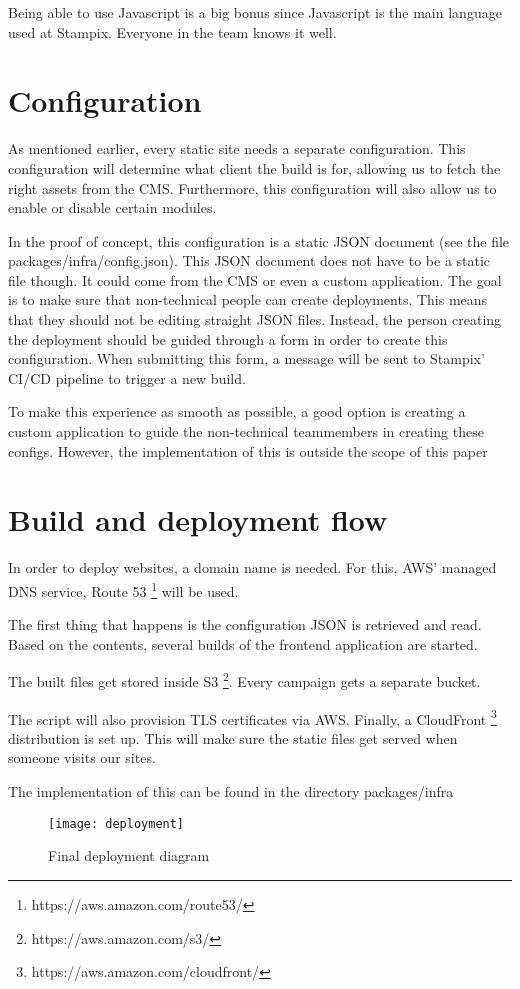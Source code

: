 Being able to use Javascript is a big bonus since Javascript is the main language used at Stampix. Everyone in the team knows it well.

\section{Configuration}

As mentioned earlier, every static site needs a separate configuration. 
This configuration will determine what client the build is for, allowing us to fetch the right assets from the CMS. 
Furthermore, this configuration will also allow us to enable or disable certain modules. 

In the proof of concept, this configuration is a static JSON document (see the file packages/infra/config.json). This JSON document does not have to be a static file though. 
It could come from the CMS or even a custom application. 
The goal is to make sure that non-technical people can create deployments. This means that they should not be editing straight JSON files.
Instead, the person creating the deployment should be guided through a form in order to create this configuration. 
When submitting this form, a message will be sent to Stampix' CI/CD pipeline to trigger a new build. 

To make this experience as smooth as possible, a good option is creating a custom application to guide the non-technical teammembers in creating these configs. 
However, the implementation of this is outside the scope of this paper

\section{Build and deployment flow}

In order to deploy websites, a domain name is needed. For this, AWS' managed DNS service, Route 53 \footnote{https://aws.amazon.com/route53/} will be used.

The first thing that happens is the configuration JSON is retrieved and read. Based on the contents, several builds of the frontend application are started.

The built files get stored inside S3 \footnote{https://aws.amazon.com/s3/}. Every campaign gets a separate bucket.

The script will also provision TLS certificates via AWS. 
Finally, a CloudFront \footnote{https://aws.amazon.com/cloudfront/} distribution is set up. This will make sure the static files get served when someone visits our sites.

The implementation of this can be found in the directory packages/infra


\begin{figure}[h!]
	\centering
	\texttt{[image: deployment]}
	\caption{Final deployment diagram}
	\label{fig:deployment}
\end{figure}